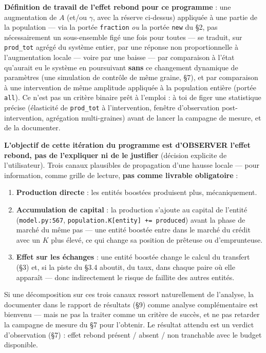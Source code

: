 \documentclass[11pt,a4paper]{article}
\newcommand{\code}[1]{\texttt{#1}}
\begin{document}
\textbf{Définition de travail de l'effet rebond pour ce programme} : une
augmentation de $A$ (et/ou $\gamma$, avec la réserve ci-dessus) appliquée
à une partie de la population --- via la portée \code{fraction}
\emph{ou} la portée \code{new} du \S2, pas nécessairement un
sous-ensemble figé une fois pour toutes --- se traduit, sur
\code{prod\_tot} agrégé du système entier, par une réponse non
proportionnelle à l'augmentation locale --- voire par une baisse --- par
comparaison à l'état qu'aurait eu le système en poursuivant \textbf{sans}
ce changement dynamique de paramètres (une simulation de contrôle de
même graine, \S7), et par comparaison à une intervention de même
amplitude appliquée à la population entière (portée \code{all}). Ce
n'est pas un critère binaire prêt à l'emploi : à toi de figer une
statistique précise (élasticité de \code{prod\_tot} à l'intervention,
fenêtre d'observation post-intervention, agrégation multi-graines) avant
de lancer la campagne de mesure, et de la documenter.

\textbf{L'objectif de cette itération du programme est d'OBSERVER l'effet
rebond, pas de l'expliquer ni de le justifier} (décision explicite de
l'utilisateur). Trois canaux plausibles de propagation d'une hausse
locale --- pour information, comme grille de lecture, \textbf{pas comme
livrable obligatoire} :

\begin{enumerate}
\item \textbf{Production directe} : les entités boostées produisent
  plus, mécaniquement.
\item \textbf{Accumulation de capital} : la production s'ajoute au
  capital de l'entité (\code{model.py:567},
  \code{population.K[entity] += produced}) avant la phase de marché du
  même pas --- une entité boostée entre dans le marché du crédit avec un
  $K$ plus élevé, ce qui change sa position de prêteuse ou d'emprunteuse.
\item \textbf{Effet sur les échanges} : une entité boostée change le
  calcul du transfert (\S3) et, si la piste du \S3.4 aboutit, du taux,
  dans chaque paire où elle apparaît --- donc indirectement le risque de
  faillite des autres entités.
\end{enumerate}

Si une décomposition sur ces trois canaux ressort naturellement de
l'analyse, la documenter dans le rapport de résultats (\S9) comme
analyse complémentaire est bienvenu --- mais ne pas la traiter comme un
critère de succès, et ne pas retarder la campagne de mesure du \S7 pour
l'obtenir. Le résultat attendu est un verdict d'observation (\S7) : effet
rebond présent / absent / non tranchable avec le budget disponible.
\end{document}
